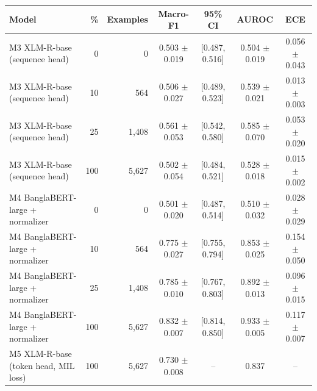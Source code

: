 \begin{tabular}{@{}lrrcccc@{}}
\toprule
Model & \% & Examples & Macro-F1 & 95\% CI & AUROC & ECE \\
\midrule
M3 XLM-R-base (sequence head) & 0 & 0 & 0.503 $\pm$ 0.019 & [0.487, 0.516] & 0.504 $\pm$ 0.019 & 0.056 $\pm$ 0.043 \\
M3 XLM-R-base (sequence head) & 10 & 564 & 0.506 $\pm$ 0.027 & [0.489, 0.523] & 0.539 $\pm$ 0.021 & 0.013 $\pm$ 0.003 \\
M3 XLM-R-base (sequence head) & 25 & 1,408 & 0.561 $\pm$ 0.053 & [0.542, 0.580] & 0.585 $\pm$ 0.070 & 0.053 $\pm$ 0.020 \\
M3 XLM-R-base (sequence head) & 100 & 5,627 & 0.502 $\pm$ 0.054 & [0.484, 0.521] & 0.528 $\pm$ 0.018 & 0.015 $\pm$ 0.002 \\
\midrule
M4 BanglaBERT-large + normalizer & 0 & 0 & 0.501 $\pm$ 0.020 & [0.487, 0.514] & 0.510 $\pm$ 0.032 & 0.028 $\pm$ 0.029 \\
M4 BanglaBERT-large + normalizer & 10 & 564 & 0.775 $\pm$ 0.027 & [0.755, 0.794] & 0.853 $\pm$ 0.025 & 0.154 $\pm$ 0.050 \\
M4 BanglaBERT-large + normalizer & 25 & 1,408 & 0.785 $\pm$ 0.010 & [0.767, 0.803] & 0.892 $\pm$ 0.013 & 0.096 $\pm$ 0.015 \\
M4 BanglaBERT-large + normalizer & 100 & 5,627 & 0.832 $\pm$ 0.007 & [0.814, 0.850] & 0.933 $\pm$ 0.005 & 0.117 $\pm$ 0.007 \\
\midrule
M5 XLM-R-base (token head, MIL loss) & 100 & 5,627 & 0.730 $\pm$ 0.008 & -- & 0.837 & -- \\
\bottomrule
\end{tabular}